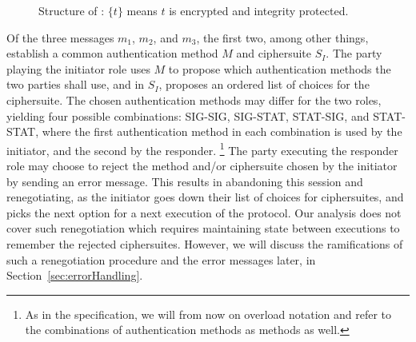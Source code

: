 \documentclass[runningheads]{llncs}
\newcommand{\mConstStyle}[1]{\textsf{#1}}
\newcommand{\mMethodStyle}[1]{\mConstStyle{#1}}
\newcommand{\mProtocolStyle}[1]{\text{#1}}
\newcommand{\mSpec}{specification}  %
\newcommand{\mEdhoc}{\mProtocolStyle{EDHOC}}
\newcommand{\mStatStat}{\mMethodStyle{STAT-STAT}}
\newcommand{\mStatSig}{\mMethodStyle{STAT-SIG}}
\newcommand{\mSigStat}{\mMethodStyle{SIG-STAT}}
\newcommand{\mSigSig}{\mMethodStyle{SIG-SIG}}
\newcommand{\mSuites}{\ensuremath{S_I}}
\newcommand{\mMethod}{\ensuremath{M}}
\newcommand{\mCi}{\ensuremath{C_I}}
\newcommand{\mCr}{\ensuremath{C_R}}
\newcommand{\mGx}{\ensuremath{Q_{e,I}}}
\newcommand{\mGy}{\ensuremath{Q_{e,R}}}
\newcommand{\mAuthi}{\ensuremath{\mathit{Auth}_I}}
\newcommand{\mAuthr}{\ensuremath{\mathit{Auth}_R}}
\newcommand{\mMsgone}{\ensuremath{m_1}}
\newcommand{\mMsgtwo}{\ensuremath{m_2}}
\newcommand{\mMsgthree}{\ensuremath{m_3}}
\newcommand{\mADone}{\ensuremath{\mathit{ad}_1}}
\newcommand{\mADtwo}{\ensuremath{\mathit{ad}_2}}
\newcommand{\mADthree}{\ensuremath{\mathit{ad}_3}}
\newcommand{\mIdcredi}{\ensuremath{ID_I}}
\newcommand{\mIdcredr}{\ensuremath{ID_R}}
\newcommand{\msg}[4]{\draw[->,thick] ([yshift=-#1]#2.south) coordinate (l1)--(l1-|#3) node[midway, above]{#4}}
\begin{document}
%
\begin{figure}[ht]
\centering
{}
    \caption{Structure of \mEdhoc{}: $\{t\}$ means $t$ is encrypted and integrity
protected.~\cite{Norr21}}
\label{fig:edhocFramework}
\end{figure}
%
Of the three messages \mMsgone, \mMsgtwo, and \mMsgthree, the first two, among other things, establish a
common authentication method \mMethod{} and ciphersuite \mSuites{}.
%
The party playing the initiator role uses \mMethod{} to propose which
authentication methods the two parties shall use, and in \mSuites{}, proposes an ordered list
of choices for the ciphersuite.
%
The chosen authentication methods may differ for the two roles,
yielding four possible
combinations: \mSigSig{}, \mSigStat{}, \mStatSig{}, and \mStatStat{},
where the first authentication method in each combination is used by the
initiator, and the second by the responder.
\footnote{As in the \mSpec{}, we will from now on overload
notation and refer to the combinations of authentication methods as methods
as
well.}
%
The party executing the responder role may choose to reject the method and/or
ciphersuite chosen by the initiator by sending an error message.
%
This results in abandoning this session and renegotiating, as the initiator
goes down their list of choices for ciphersuites, and picks the next option for
a next execution of the protocol.
%
Our analysis does not cover such renegotiation which requires maintaining
state
between executions to remember the rejected ciphersuites.
%
However, we will discuss the ramifications of such a renegotiation procedure
and the error messages later, in Section~\ref{sec:errorHandling}.
%
\end{document}
